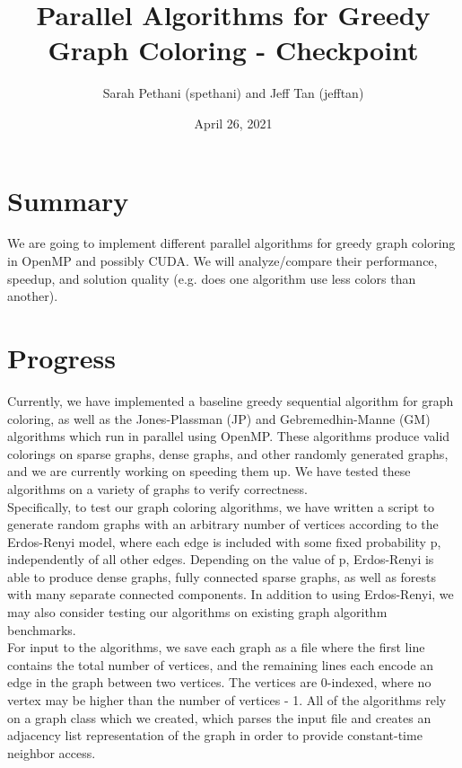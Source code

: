 \documentclass[11pt]{article}
\title{Parallel Algorithms for Greedy Graph Coloring - Checkpoint}
\date{April 26, 2021}
\author{Sarah Pethani (spethani) and Jeff Tan (jefftan)}
\begin{document}
                        

\thispagestyle{plain}
\maketitle

\section{Summary}
We are going to implement different parallel algorithms for greedy graph coloring in OpenMP and possibly CUDA. We will analyze/compare their performance, speedup, and solution quality (e.g. does one algorithm use less colors than another).

\section{Progress}
Currently, we have implemented a baseline greedy sequential algorithm for graph coloring, as well as the Jones-Plassman (JP) and Gebremedhin-Manne (GM) algorithms which run in parallel using OpenMP. These algorithms produce valid colorings on sparse graphs, dense graphs, and other randomly generated graphs, and we are currently working on speeding them up. We have tested these algorithms on a variety of graphs to verify correctness.\\

Specifically, to test our graph coloring algorithms, we have written a script to generate random graphs with an arbitrary number of vertices according to the Erdos-Renyi model, where each edge is included with some fixed probability p, independently of all other edges. Depending on the value of p, Erdos-Renyi is able to produce dense graphs, fully connected sparse graphs, as well as forests with many separate connected components. In addition to using Erdos-Renyi, we may also consider testing our algorithms on existing graph algorithm benchmarks.\\

For input to the algorithms, we save each graph as a file where the first line contains the total number of vertices, and the remaining lines each encode an edge in the graph between two vertices. The vertices are 0-indexed, where no vertex may be higher than the number of vertices - 1. All of the algorithms rely on a graph class which we created, which parses the input file and creates an adjacency list representation of the graph in order to provide constant-time neighbor access.\\
\end{document}
